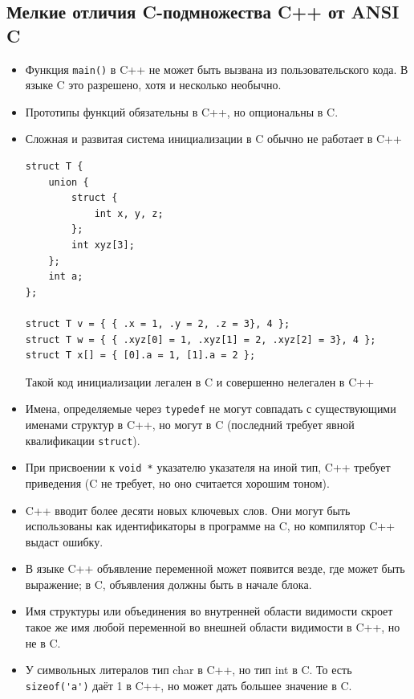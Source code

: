 \documentclass[a4paper,12pt,oneside]{article}
\begin{document}
\subsection{Мелкие отличия C-подмножества C++ от ANSI C}

\begin{itemize}
\item
Функция \lstinline!main()! в C++ не может быть вызвана из пользовательского кода. В языке C это разрешено, хотя и несколько необычно.
\item
Прототипы функций обязательны в C++, но опциональны в C.
\item
Сложная и развитая система инициализации в C обычно не работает в C++

\begin{lstlisting}
struct T {
    union {
        struct {
            int x, y, z;
        };
        int xyz[3];
    };
    int a;
};

struct T v = { { .x = 1, .y = 2, .z = 3}, 4 };
struct T w = { { .xyz[0] = 1, .xyz[1] = 2, .xyz[2] = 3}, 4 };
struct T x[] = { [0].a = 1, [1].a = 2 };
\end{lstlisting}

Такой код инициализации легален в C и совершенно нелегален в C++
\item
Имена, определяемые через \lstinline!typedef! не могут совпадать с существующими именами структур в C++, но могут в C (последний требует явной квалификации \lstinline!struct!).
\item
При присвоении к \lstinline!void *! указателю указателя на иной тип, C++ требует приведения (C не требует, но оно считается хорошим тоном).
\item
C++ вводит более десяти новых ключевых слов. Они могут быть использованы как идентификаторы в программе на C, но компилятор C++ выдаст ошибку.
\item
В языке C++ объявление переменной может появится везде, где может быть выражение; в C, объявления должны быть в начале блока.
\item
Имя структуры или объединения во внутренней области видимости скроет такое же имя любой переменной во внешней области видимости в C++, но не в C.
\item
У символьных литералов тип char в C++, но тип int в C. То есть \lstinline!sizeof('a')! даёт 1 в C++, но может дать большее значение в C.
\end{itemize}

\pagebreak
\end{document}
